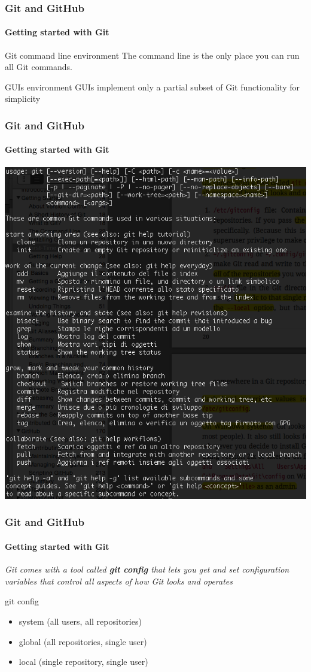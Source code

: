\begin{frame}
    \frametitle{Git and GitHub}
    \framesubtitle{Getting started with Git}
    \addtocounter{nframe}{1}
    
	\begin{block}{Git command line environment}
		The command line is the only place you can run all Git commands.
    \end{block}

	\begin{block}{GUIs environment}
		GUIs implement only a partial subset of Git functionality for simplicity
    \end{block}
	
\end{frame}

\begin{frame}
	\frametitle{Git and GitHub}
    \framesubtitle{Getting started with Git}
    \addtocounter{nframe}{1}

	\begin{center}
		\includegraphics[width=.7\textwidth]{imgs/git-commands.png}
	\end{center}

\end{frame}

\begin{frame}
    \frametitle{Git and GitHub}
    \framesubtitle{Getting started with Git}
    \addtocounter{nframe}{1}
	
	\emph{Git comes with a tool called \textbf{git config} that lets you get and set configuration variables that control all aspects of how Git looks and operates}

	\begin{block}{git config}
		\begin{itemize}
			\item system (all users, all repositories)
			\item global (all repositories, single user)
			\item local (single repository, single user)
		\end{itemize}
    \end{block}

\end{frame}

